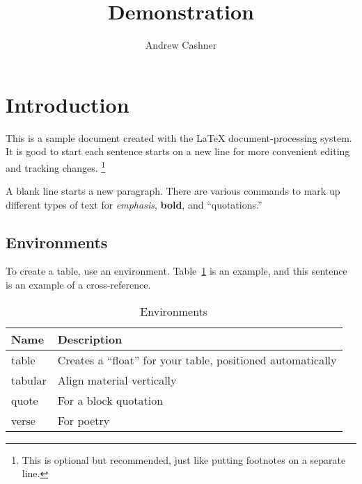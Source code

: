 \documentclass{article}
\title{Demonstration}
\author{Andrew Cashner}
\begin{document}
\maketitle

\tableofcontents
\listoftables

\section{Introduction}

This is a sample document created with the \LaTeX{} document-processing system.
It is good to start each sentence starts on a new line for more convenient editing and tracking changes.%
  \footnote{This is optional but recommended, just like putting footnotes on a separate line.}

A blank line starts a new paragraph.
There are various commands to mark up different types of text for \emph{emphasis}, \textbf{bold}, and ``quotations.''

\lipsum

\subsection{Environments}

To create a table, use an environment.
Table~\ref{environments} is an example, and this sentence is an example of a cross-reference.

\lipsum

\begin{table}

\begin{tabular}{ll} %
\toprule
Name & Description\\ 
\midrule
table & Creates a ``float'' for your table, positioned automatically\\
tabular & Align material vertically\\
quote & For a block quotation\\
verse & For poetry\\
\bottomrule
\end{tabular}

\caption{Environments}
\label{environments} %

\end{table}
\end{document}

